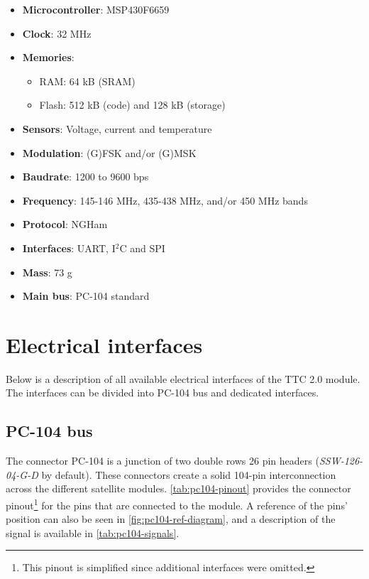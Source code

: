 \begin{itemize}
    \item \textbf{Microcontroller}: MSP430F6659
    \item \textbf{Clock}: 32 MHz
    \item \textbf{Memories}:
    \begin{itemize}
        \item RAM: 64 kB (SRAM)
        \item Flash: 512 kB (code) and 128 kB (storage)
    \end{itemize}
    \item \textbf{Sensors}: Voltage, current and temperature
    \item \textbf{Modulation}: (G)FSK and/or (G)MSK
    \item \textbf{Baudrate}: 1200 to 9600 bps
    \item \textbf{Frequency}: 145-146 MHz, 435-438 MHz, and/or 450 MHz bands
    \item \textbf{Protocol}: NGHam
    \item \textbf{Interfaces}: UART, I$^{2}$C and SPI
    \item \textbf{Mass}: 73 g
    \item \textbf{Main bus}: PC-104 standard
\end{itemize}

\section{Electrical interfaces}

Below is a description of all available electrical interfaces of the TTC 2.0 module. The interfaces can be divided into PC-104 bus and dedicated interfaces.

\subsection{PC-104 bus}

The connector PC-104 is a junction of two double rows 26 pin headers (\textit{SSW-126-04-G-D} by default). These connectors create a solid 104-pin interconnection across the different satellite modules. \autoref{tab:pc104-pinout} provides the connector pinout\footnote{This pinout is simplified since additional interfaces were omitted.} for the pins that are connected to the module. A reference of the pins' position can also be seen in \autoref{fig:pc104-ref-diagram}, and a description of the signal is available in \autoref{tab:pc104-signals}.

